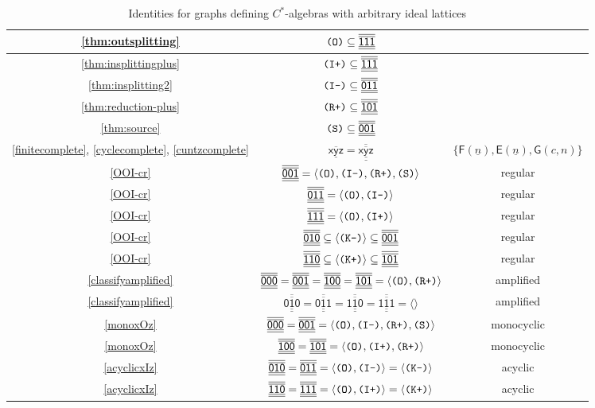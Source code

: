 \documentclass[12pt]{amsbook}%
\theoremstyle{defin}
\theoremstyle{remark}
\numberwithin{equation}{chapter}
\numberwithin{theor}{section}
\newcommand{\nn}{\underline{n}}
\newcommand{\xyzrel}[1]{\mbox{$\overline{\underline{\mathsf{ #1}}}$}}
\newcommand{\xyzLPArel}[1]{\mbox{$\overline{\overline{\underline{\underline{\mathsf{ #1}}}}}$}}
\newcommand{\IIIm}{\mbox{\texttt{\textup{(I-)}}}}
\newcommand{\IIIp}{\mbox{\texttt{\textup{(I+)}}}}
\newcommand{\OOO}{\mbox{\texttt{\textup{(O)}}}}
\newcommand{\RRRp}{\mbox{\texttt{\textup{(R+)}}}}
\newcommand{\KKKp}{\mbox{\texttt{\textup{(K+)}}}}
\newcommand{\KKKm}{\mbox{\texttt{\textup{(K-)}}}}
\newcommand{\SSS}{\mbox{\texttt{\textup{(S)}}}}
\newcommand{\GF}{{\mathsf F}}
\newcommand{\GC}{{\mathsf E}}
\newcommand{\GO}{{\mathsf G}}
\begin{document}
 \setlength{\extrarowheight}{1.7mm}
 \begin{table}
 \begin{center}
 \begin{tabular}{|c|c|c|}\hline
 \ref{thm:outsplitting}&$\OOO\subseteq \xyzLPArel{111}$&\\\hline
 \ref{thm:insplittingplus}&$\IIIp\subseteq \xyzLPArel{111}$&\\\hline 
 \ref{thm:insplitting2}&$\IIIm\subseteq \xyzLPArel{011}$&\\\hline 
 \ref{thm:reduction-plus}&$\RRRp\subseteq \xyzLPArel{101}$&\\\hline 
 \ref{thm:source}&$\SSS\subseteq \xyzLPArel{001}$&\\\hline 
 \ref{finitecomplete}, \ref{cyclecomplete},  \ref{cuntzcomplete} &$\xyzrel{xyz}=\xyzLPArel{xyz}$&$\{\GF(\nn),\GC(\nn),\GO(c,n)\}$\\\hline
   \ref{OOI-cr}&$\xyzLPArel{001}=\langle\OOO,\IIIm,\RRRp,\SSS\rangle$&regular\\\hline
  \ref{OOI-cr}&$\xyzLPArel{011}=\langle\OOO,\IIIm\rangle$&regular\\\hline  
  \ref{OOI-cr}&$\xyzLPArel{111}=\langle\OOO,\IIIp\rangle$&regular\\\hline  
  \ref{OOI-cr}&$\xyzLPArel{010}\subseteq\langle\KKKm\rangle\subseteq\xyzLPArel{001}$&regular\\\hline
  \ref{OOI-cr}&$\xyzLPArel{110}\subseteq\langle\KKKp\rangle\subseteq\xyzLPArel{101}$&regular\\\hline
    \ref{classifyamplified}&$\xyzLPArel{000}=\xyzLPArel{001}=\xyzLPArel{100}=\xyzLPArel{101}=\langle\OOO,\RRRp\rangle$&amplified\\\hline  
  \ref{classifyamplified}&$\xyzLPArel{010}=\xyzLPArel{011}=\xyzLPArel{110}=\xyzLPArel{111}=\langle\rangle$&amplified\\\hline  
    \ref{monoxOz}&$\xyzLPArel{000}=\xyzLPArel{001}=\langle\OOO,\IIIm,\RRRp,\SSS\rangle$& monocyclic\\\hline  
  \ref{monoxOz}&$\xyzLPArel{100}=\xyzLPArel{101}=\langle\OOO,\IIIp,\RRRp\rangle$& monocyclic\\\hline 
  \ref{acyclicxIz}&$\xyzLPArel{010}=\xyzLPArel{011}=\langle\OOO,\IIIm\rangle=\langle\KKKm\rangle$&acyclic\\\hline 
  \ref{acyclicxIz}&$\xyzLPArel{110}=\xyzLPArel{111}=\langle\OOO,\IIIp\rangle=\langle\KKKp\rangle$&acyclic\\\hline 
                             \end{tabular}
 \end{center}
 \caption{Identities for graphs defining $C^*$-algebras with arbitrary ideal lattices}\label{LPAgen}
 \end{table}
 
\end{document}
